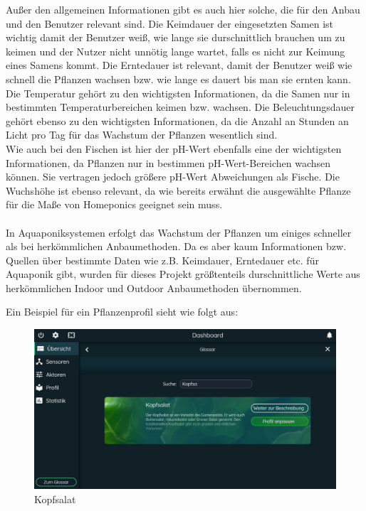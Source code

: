Außer den allgemeinen Informationen gibt es auch hier solche, die für den Anbau und den Benutzer relevant sind. Die Keimdauer der eingesetzten Samen ist wichtig damit der Benutzer weiß, wie lange sie durschnittlich brauchen um zu keimen und der Nutzer nicht unnötig lange wartet, falls es nicht zur Keimung eines Samens kommt. Die Erntedauer ist relevant, damit der Benutzer weiß wie schnell die Pflanzen wachsen bzw. wie lange es dauert bis man sie ernten kann.\\ Die Temperatur gehört zu den wichtigsten Informationen, da die Samen nur in bestimmten Temperaturbereichen keimen bzw. wachsen. Die Beleuchtungsdauer gehört ebenso zu den wichtigsten Informationen, da die Anzahl an Stunden an Licht pro Tag für das Wachstum der Pflanzen wesentlich sind. \\ Wie auch bei den Fischen ist hier der pH-Wert ebenfalls eine der wichtigsten Informationen, da Pflanzen nur in bestimmen pH-Wert-Bereichen wachsen können. Sie vertragen jedoch größere pH-Wert Abweichungen als Fische. 
\newpage 
Die Wuchshöhe ist ebenso relevant, da wie bereits erwähnt die ausgewählte Pflanze für die Maße von Homeponics geeignet sein muss.\\ \mbox{} \\In Aquaponiksystemen erfolgt das Wachstum der Pflanzen um einiges schneller als bei herkömmlichen Anbaumethoden. Da es aber kaum Informationen bzw. Quellen über bestimmte Daten wie z.B. Keimdauer, Erntedauer etc. für Aquaponik gibt, wurden für dieses Projekt größtenteils durschnittliche Werte aus herkömmlichen Indoor und Outdoor Anbaumethoden übernommen.

Ein Beispiel für ein Pflanzenprofil sieht wie folgt aus:

\begin{figure}[ht]
    \centering
	\includegraphics[width=\textwidth]{images/salat}
    \caption{Kopfsalat}
\end{figure}\mbox{}




\afterpage{\blankpage}
\afterpage{\blankpage}